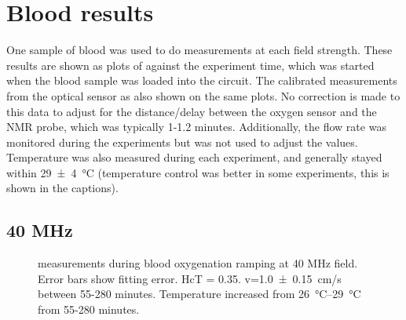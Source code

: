 \section{Blood results}

One sample of blood was used to do measurements at each field strength.
These results are shown as plots of \Ttwo against the experiment time, which was started when the blood sample was loaded into the circuit.
The calibrated \SOtwo measurements from the optical sensor as also shown on the same plots.
No correction is made to this data to adjust for the distance/delay between the oxygen sensor and the NMR probe, which was typically 1-1.2 minutes.
Additionally, the flow rate was monitored during the experiments but was not used to adjust the \Ttwo values.
Temperature was also measured during each experiment, and generally stayed within \SI{29\pm4}{\celsius} (temperature control was better in some experiments, this is shown in the captions).

\subsection{40 MHz}
\begin{figure}[t]
\centering
{}
\caption[\Ttwo measurements during blood oxygenation ramping at 40 MHz field]{\Ttwo measurements during blood oxygenation ramping at 40 MHz field. Error bars show \Ttwo fitting error. HcT = 0.35. v=\SI{1.0\pm0.15}{cm/s} between  55-280 minutes. Temperature increased from \SIrange{26}{29}{\celsius} from 55-280 minutes.}
\label{fig:contflow-40mhzT2Time}
\end{figure}

